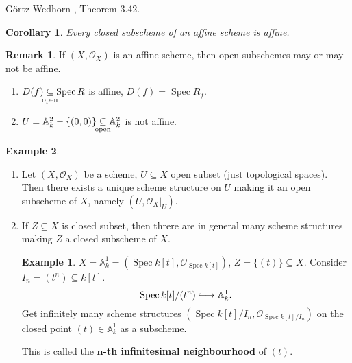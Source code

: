 \documentclass[12pt]{article}
\DeclareMathOperator{\Spec}{Spec}
\newtheorem*{corollary}{Corollary}
\theoremstyle{definition}
\newtheorem*{remark}{Remark}
\newtheorem*{example}{Example}
\theoremstyle{remark}
\begin{document}
G\"{o}rtz-Wedhorn \cite{gortz2010algebraic}, Theorem 3.42.

\begin{corollary}
Every closed subscheme of an affine scheme is affine.
\end{corollary}

\begin{remark}
If $(X,\mathcal{O}_X)$ is an affine scheme, then open subschemes may or may not be affine.

\begin{enumerate}[label=\arabic*)]
\item $D(f)\underset{\mathclap{\text{open}}}{\subseteq}\Spec R$ is affine, $D(f)=\Spec R_f$.

\item $U=\mathbb{A}_k^2-\{(0,0)\}\underset{\mathclap{\text{open}}}{\subseteq}\mathbb{A}_k^2$ is not affine.
\end{enumerate}
\end{remark}

\begin{example}
\begin{enumerate}[label=\arabic*)]
\item Let $(X,\mathcal{O}_X)$ be a scheme, $U\subseteq X$ open subset (just topological spaces). Then there exists a unique scheme structure on $U$ making it an open subscheme of $X$, namely $(U,\mathcal{O}_X|_U)$.

\item If $Z\subseteq X$ is closed subset, then threre are in general many scheme structures making $Z$ a closed subscheme of $X$.
\begin{example}
$X=\mathbb{A}_k^1=(\Spec k[t],\mathcal{O}_{\Spec k[t]})$, $Z=\{(t)\}\subseteq X$. Consider $I_n=(t^n)\subseteq k[t]$.
\[\Spec k[t]/(t^n)\lhook\joinrel\longrightarrow\mathbb{A}_k^1.\]
Get infinitely many scheme structures $(\Spec k[t]/I_n,\mathcal{O}_{\Spec k[t]/I_n})$ on the closed point $(t)\in\mathbb{A}_k^1$ as a subscheme.

This is called the \textbf{$\boldsymbol{n}$-th infinitesimal neighbourhood} of $(t)$.
\end{example}
\end{enumerate}
\end{example}
\end{document}
